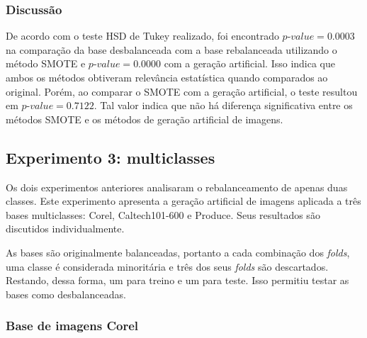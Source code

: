 \subsubsection*{Discussão}

De acordo com o teste HSD de Tukey realizado, foi encontrado $\textit{p-value} = 0.0003$ na comparação da base desbalanceada com a base rebalanceada utilizando o método SMOTE e $\textit{p-value} = 0.0000$ com a geração artificial. Isso indica que ambos os métodos obtiveram relevância estatística quando comparados ao original. Porém, ao comparar o SMOTE com a geração artificial, o teste resultou em $\textit{p-value} = 0.7122$. Tal valor indica que não há diferença significativa entre os métodos SMOTE e os métodos de geração artificial de imagens.

\subsection{Experimento 3: multiclasses}

Os dois experimentos anteriores analisaram o rebalanceamento de apenas duas classes. Este experimento apresenta a geração artificial de imagens aplicada a três bases multiclasses: Corel, Caltech101-600 e Produce. Seus resultados são discutidos individualmente.

As bases são originalmente balanceadas, portanto a cada combinação dos \textit{folds}, uma classe é considerada minoritária e três dos seus \textit{folds} são descartados. Restando, dessa forma, um para treino e um para teste. Isso permitiu testar as bases como desbalanceadas.

\subsubsection{Base de imagens Corel}


